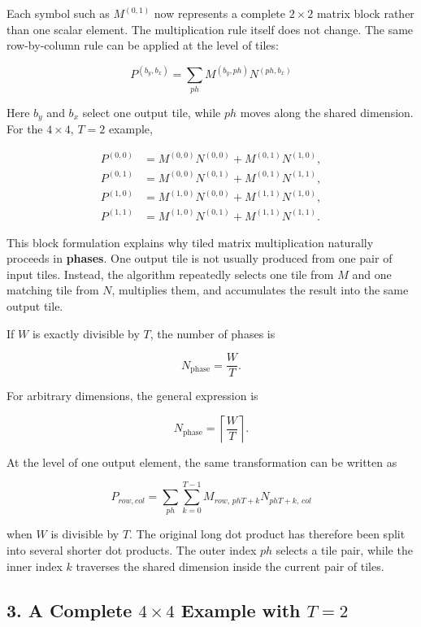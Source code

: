 \documentclass[11pt,a4paper]{article}
\begin{document}
Each symbol such as $M^{(0,1)}$ now represents a complete $2\times2$ matrix block rather than one scalar element. The multiplication rule itself does not change. The same row-by-column rule can be applied at the level of tiles:

\[
\boxed{
P^{(b_y,b_x)}
=
\sum_{ph}
M^{(b_y,ph)}N^{(ph,b_x)}
}
\]

Here $b_y$ and $b_x$ select one output tile, while $ph$ moves along the shared dimension. For the $4\times4$, $T=2$ example,

\[
\begin{aligned}
P^{(0,0)}
&=M^{(0,0)}N^{(0,0)}
 +M^{(0,1)}N^{(1,0)},
\\
P^{(0,1)}
&=M^{(0,0)}N^{(0,1)}
 +M^{(0,1)}N^{(1,1)},
\\
P^{(1,0)}
&=M^{(1,0)}N^{(0,0)}
 +M^{(1,1)}N^{(1,0)},
\\
P^{(1,1)}
&=M^{(1,0)}N^{(0,1)}
 +M^{(1,1)}N^{(1,1)}.
\end{aligned}
\]

This block formulation explains why tiled matrix multiplication naturally proceeds in \textbf{phases}. One output tile is not usually produced from one pair of input tiles. Instead, the algorithm repeatedly selects one tile from $M$ and one matching tile from $N$, multiplies them, and accumulates the result into the same output tile.

If $W$ is exactly divisible by $T$, the number of phases is

\[
    N_{\text{phase}} = \frac{W}{T}.
\]

For arbitrary dimensions, the general expression is

\[
    N_{\text{phase}}
    =
    \left\lceil \frac{W}{T}\right\rceil.
\]

At the level of one output element, the same transformation can be written as

\[
\boxed{
P_{row,col}
=
\sum_{ph}
\sum_{k=0}^{T-1}
M_{row,\,phT+k}
N_{phT+k,\,col}
}
\]

when $W$ is divisible by $T$. The original long dot product has therefore been split into several shorter dot products. The outer index $ph$ selects a tile pair, while the inner index $k$ traverses the shared dimension inside the current pair of tiles.

\subsection{3. A Complete $4\times4$ Example with $T=2$}
\end{document}
